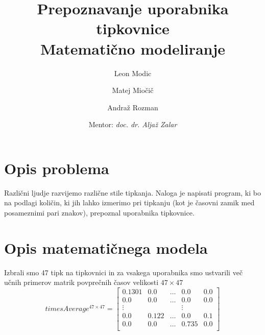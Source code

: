 \documentclass[12pt]{article}
\begin{document}
\title{\textbf{Prepoznavanje uporabnika tipkovnice \\ \large{Matematično modeliranje}}}
\author{
  Leon Modic\\
  \and
  Matej Miočič\\
  \and
  Andraž Rozman\\
  \and
  Mentor: \textit{doc. dr. Aljaž Zalar}
}
\maketitle

\section{Opis problema}
Različni ljudje razvijemo različne stile tipkanja. Naloga je napisati program,
ki bo na podlagi količin, ki jih lahko izmerimo pri tipkanju (kot je časovni
zamik med posameznimi pari znakov), prepoznal uporabnika tipkovnice.

\section{Opis matematičnega modela}
Izbrali smo 47 tipk na tipkovnici in za vsakega uporabnika smo ustvarili več učnih
primerov matrik povprečnih časov velikosti $47 \times 47$
\[
  timesAverage^{47 \times 47}=
  \begin{bmatrix}
    0.1301 & 0.0 & \dots & 0.0 & 0.0\\
    0.0 & 0.0 & \dots & 0.0 & 0.0\\
    \vdots & & & \vdots\\
    0.0 & 0.122 & \dots & 0.0 & 0.1\\
    0.0 & 0.0 & \dots & 0.735 & 0.0\\
  \end{bmatrix}
\]
\end{document}
